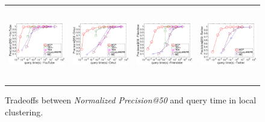 \begin{figure}[t]
	\begin{small}
		\centering
		\vspace{-5mm}
		\begin{tabular}{cccc}
			\hspace{-4mm} \includegraphics[height=32.7mm]{./Figs/HKPR-precision-query-YT.eps} &
			\hspace{-4mm} \includegraphics[height=32.7mm]{./Figs/HKPR-precision-query-OL.eps} &
			\hspace{-4mm} \includegraphics[height=32.7mm]{./Figs/HKPR-precision-query-FR.eps} &
			\hspace{-4mm} \includegraphics[height=32.7mm]{./Figs/HKPR-precision-query-TW.eps} 
		\end{tabular}
		\vspace{-5mm}
		\caption{Tradeoffs between {\em Normalized Precision@50} and query time in local clustering.}
		\label{fig:HKPR-precision-query}
	\end{small}
\end{figure}


